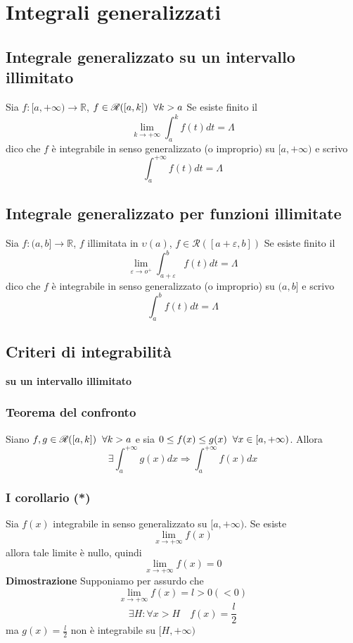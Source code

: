 \documentclass[12pt]{article}
\begin{document}
\section{Integrali generalizzati}

\subsection{Integrale generalizzato su un intervallo illimitato}
Sia $f: [a, +\infty) \to \mathbb{R}$, $f \in \mathscr{R} ([a,k]) \hspace*{0.2cm} \forall k>a$
Se esiste finito il 
\[ \lim_{k \to +\infty} \int_a^k f(t) dt = \Lambda \] dico che $f$ è integrabile in senso generalizzato (o improprio) su $[a, +\infty)$ e scrivo 
\[ \int_a^{+\infty} f(t)dt = \Lambda \]

\subsection{Integrale generalizzato per funzioni illimitate}
Sia $f: (a, b] \to \mathbb{R}$, $f$ illimitata in $\upsilon (a)$, $f \in \mathscr{R} ([a+\varepsilon, b])$ Se esiste finito il 
\[ \lim_{\varepsilon \to o^+} \int_{a +\varepsilon}^b f(t) dt = \Lambda\] 
dico che $f$ è integrabile in senso generalizzato (o improprio) su $(a,b]$ e scrivo
\[ \int_a^b f(t) dt = \Lambda \]

\subsection{Criteri di integrabilità}
\textbf{su un intervallo illimitato}
\subsubsection{Teorema del confronto}
Siano $f, g \in \mathscr{R}([a,k]) \hspace*{0.2cm} \forall k>a$ e sia $0 \leq f(x) \leq g(x) \hspace*{0.2cm} \forall x \in [a, +\infty )$. Allora
\[ \exists \int_a^{+\infty} g(x) dx \Rightarrow \int_a^{+\infty} f(x) dx\]
\subsubsection{I corollario (*)}
Sia $f(x)$ integrabile in senso generalizzato su $[a, +\infty)$. Se esiste
\[ \lim_{x\to +\infty} f(x)\]
allora tale limite è nullo, quindi
\[\lim_{x\to +\infty} f(x) = 0 \]
\textbf{Dimostrazione}\newline
Supponiamo per assurdo che
\[\lim_{x\to +\infty} f(x) = l > 0 (<0)\]
\[\exists H : \forall x > H \quad f(x) = \frac{l}{2}\]
ma $g(x) = \frac{l}{2}$ non è integrabile su $[H, +\infty)$
\end{document}
